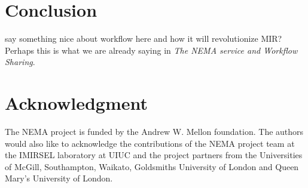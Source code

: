 \documentclass[conference]{IEEEtran}
\begin{document}
\section{Conclusion}
say something nice about workflow here and how it will revolutionize MIR? Perhaps this is what we are already saying in \emph{The NEMA service and Workflow Sharing}.

\section*{Acknowledgment}
The NEMA project is funded by the Andrew W. Mellon foundation. The authors would also like to acknowledge the contributions of the NEMA project team at the IMIRSEL laboratory at UIUC and the project partners from the Universities of McGill, Southampton, Waikato, Goldsmiths University of London and Queen Mary's University of London.






%
%
%

 

\end{document}
